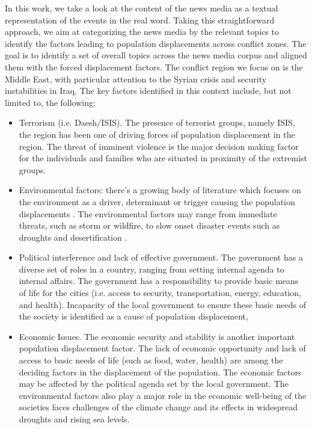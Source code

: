 \begin{appendices}
In this work, we take a look at the content of the news media as a textual representation of the events in the real word. Taking this straightforward approach, we aim at categorizing the news media by the relevant topics to identify the factors leading to population displacements across conflict zones. The goal is to identify a  set of overall topics across the news media corpus and aligned them with the forced displacement factors. The conflict region we focus on is the Middle East, with particular attention to the Syrian crisis and security instabilities in Iraq. The key factors identified in this context include, but not limited to, the following:

\begin{itemize}
    \item Terrorism (i.e. Daesh/ISIS). The presence of terrorist groups, namely ISIS, the region has been one of driving forces of population displacement in the region. The threat of imminent violence is the major decision making factor for the individuals and families who are situated in proximity of the extremist groups.
    
	\item Environmental factors: there's a growing body of literature which focuses on the environment as a driver, determinant or trigger causing the population displacements \cite{Greiner2016}. The environmental factors may range from immediate threats, such as storm or wildfire, to slow onset disaster events such as droughts and desertification \cite{Morrissey2009}. 

    \item  Political interference and lack of effective government. The government has a diverse set of roles in a country, ranging from setting internal agenda to internal affairs. The government has a responsibility to provide basic means of life for the cities (i.e. access to security, transportation, energy, education, and health). Incapacity of the local government to ensure these basic needs of the society is identified as a cause of population displacement,

    \item  Economic Issues. The economic security and stability is another important population displacement factor. The lack of economic opportunity and lack of access to basic needs of life (such as food, water, health) are among the deciding factors in the displacement of the population. The economic factors may be affected by the political agenda set by the local government. The environmental factors also play a major role in the economic well-being of the societies faces challenges of the climate change and its effects in widespread droughts and rising sea levels. 
    

\end{itemize}
\end{appendices}
